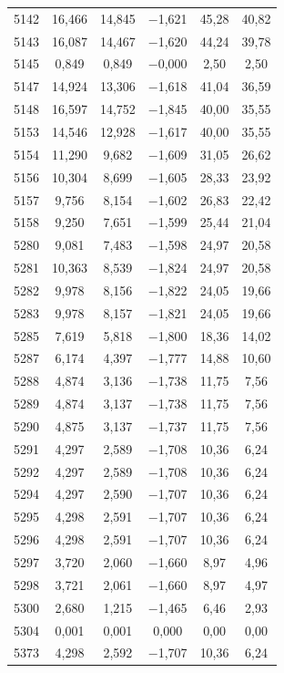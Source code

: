 \begin{longtable}{lccccc}
5142 & 16,466 & 14,845 & $-$1,621 & 45,28 & 40,82 \\
5143 & 16,087 & 14,467 & $-$1,620 & 44,24 & 39,78 \\
5145 & 0,849 & 0,849 & $-$0,000 & 2,50 & 2,50 \\
5147 & 14,924 & 13,306 & $-$1,618 & 41,04 & 36,59 \\
5148 & 16,597 & 14,752 & $-$1,845 & 40,00 & 35,55 \\
5153 & 14,546 & 12,928 & $-$1,617 & 40,00 & 35,55 \\
5154 & 11,290 & 9,682 & $-$1,609 & 31,05 & 26,62 \\
5156 & 10,304 & 8,699 & $-$1,605 & 28,33 & 23,92 \\
5157 & 9,756 & 8,154 & $-$1,602 & 26,83 & 22,42 \\
5158 & 9,250 & 7,651 & $-$1,599 & 25,44 & 21,04 \\
5280 & 9,081 & 7,483 & $-$1,598 & 24,97 & 20,58 \\
5281 & 10,363 & 8,539 & $-$1,824 & 24,97 & 20,58 \\
5282 & 9,978 & 8,156 & $-$1,822 & 24,05 & 19,66 \\
5283 & 9,978 & 8,157 & $-$1,821 & 24,05 & 19,66 \\
5285 & 7,619 & 5,818 & $-$1,800 & 18,36 & 14,02 \\
5287 & 6,174 & 4,397 & $-$1,777 & 14,88 & 10,60 \\
5288 & 4,874 & 3,136 & $-$1,738 & 11,75 & 7,56 \\
5289 & 4,874 & 3,137 & $-$1,738 & 11,75 & 7,56 \\
5290 & 4,875 & 3,137 & $-$1,737 & 11,75 & 7,56 \\
5291 & 4,297 & 2,589 & $-$1,708 & 10,36 & 6,24 \\
5292 & 4,297 & 2,589 & $-$1,708 & 10,36 & 6,24 \\
5294 & 4,297 & 2,590 & $-$1,707 & 10,36 & 6,24 \\
5295 & 4,298 & 2,591 & $-$1,707 & 10,36 & 6,24 \\
5296 & 4,298 & 2,591 & $-$1,707 & 10,36 & 6,24 \\
5297 & 3,720 & 2,060 & $-$1,660 & 8,97 & 4,96 \\
5298 & 3,721 & 2,061 & $-$1,660 & 8,97 & 4,97 \\
5300 & 2,680 & 1,215 & $-$1,465 & 6,46 & 2,93 \\
5304 & 0,001 & 0,001 & 0,000 & 0,00 & 0,00 \\
5373 & 4,298 & 2,592 & $-$1,707 & 10,36 & 6,24 \\

\end{longtable}
